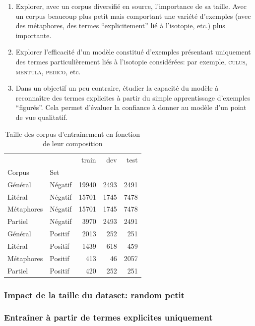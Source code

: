 \begin{enumerate}
    \item Explorer, avec un corpus diversifié en source, l'importance de sa taille. Avec un corpus beaucoup plus petit mais comportant une variété d'exemples (avec des métaphores, des termes \enquote{explicitement} lié à l'isotopie, etc.) plus importante.
    \item Explorer l'efficacité d'un modèle constitué d'exemples présentant uniquement des termes particulièrement liés à l'isotopie considérées: par exemple, \textsc{culus}, \textsc{mentula}, \textsc{pedico}, etc.
    \item Dans un objectif un peu contraire, étudier la capacité du modèle à reconnaître des termes explicites à partir du simple apprentissage d'exemples \enquote{figurés}. Cela permet d'évaluer la confiance à donner au modèle d'un point de vue qualitatif.
\end{enumerate}

\begin{table}[]
    \centering
    \begin{tabular}{ll|rrr}
    \toprule
            &         &  train &   dev &  test \\
    Corpus & Set &        &       &       \\
    \midrule
    Général & Négatif &  19940 &  2493 &  2491 \\
    Litéral & Négatif &  15701 &  1745 &  7478 \\
    Métaphores & Négatif &  15701 &  1745 &  7478 \\
    Partiel & Négatif &   3970 &  2493 &  2491 \\
    Général & Positif &   2013 &   252 &   251 \\
    Litéral & Positif &   1439 &   618 &   459 \\
    Métaphores & Positif &    413 &    46 &  2057 \\
    Partiel & Positif &    420 &   252 &   251 \\
    \bottomrule
    \end{tabular}
    \caption{Taille des corpus d'entraînement en fonction de leur composition}
    \label{tab:chap4:dataset-sizes}
\end{table}
\subsubsection{Impact de la taille du dataset: random petit}

\subsubsection{Entraîner à partir de termes explicites uniquement}

